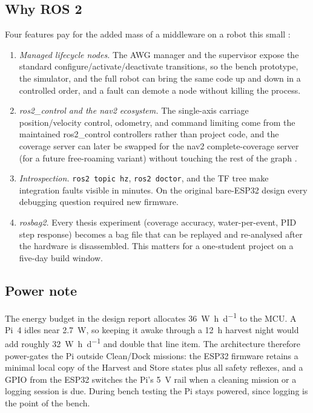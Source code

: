 \documentclass[11pt,a4paper]{article}
\begin{document}
\subsection{Why ROS 2}
Four features pay for the added mass of a middleware on a robot this small
\cite{macenski2022ros2}:
\begin{enumerate}[nosep]
\item \emph{Managed lifecycle nodes.} The AWG manager and the supervisor expose the
  standard configure/activate/deactivate transitions, so the bench prototype, the
  simulator, and the full robot can bring the same code up and down in a controlled
  order, and a fault can demote a node without killing the process.
\item \emph{ros2\_control and the nav2 ecosystem.} The single-axis carriage
  position/velocity control, odometry, and command limiting come from the maintained
  ros2\_control controllers rather than project code, and the coverage server can
  later be swapped for the nav2 complete-coverage server (for a future free-roaming
  variant) without touching the rest of the graph \cite{macenski2020marathon}.
\item \emph{Introspection.} \texttt{ros2 topic hz}, \texttt{ros2 doctor}, and the TF
  tree make integration faults visible in minutes. On the original bare-ESP32 design
  every debugging question required new firmware.
\item \emph{rosbag2.} Every thesis experiment (coverage accuracy, water-per-event,
  PID step response) becomes a bag file that can be replayed and re-analysed after
  the hardware is disassembled. This matters for a one-student project on a
  five-day build window.
\end{enumerate}

\subsection{Power note}
The energy budget in the design report allocates \SI{36}{\watt\hour\per\day} to the
MCU. A Pi~4 idles near \SI{2.7}{\watt}, so keeping it awake through a \SI{12}{\hour}
harvest night would add roughly \SI{32}{\watt\hour\per\day} and double that line
item. The architecture therefore power-gates the Pi outside Clean/Dock missions: the
ESP32 firmware retains a minimal local copy of the Harvest and Store states plus all
safety reflexes, and a GPIO from the ESP32 switches the Pi's \SI{5}{\volt} rail when
a cleaning mission or a logging session is due. During bench testing the Pi stays
powered, since logging is the point of the bench.
\end{document}
